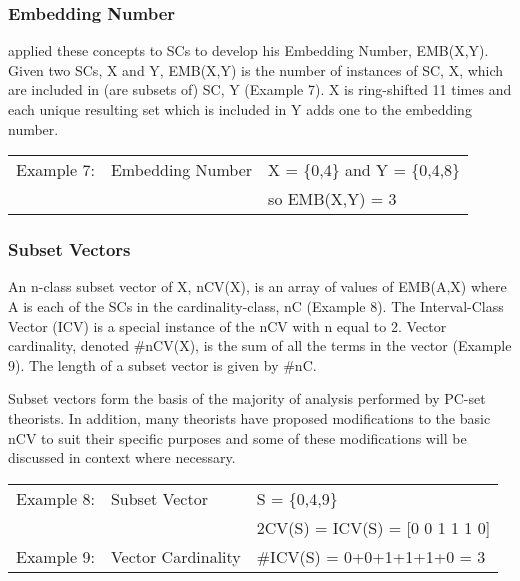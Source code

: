 \documentclass{article}
\begin{document}
\subsubsection{Embedding Number}
\label{sec-3-3-2}

\citet{Lewin1979} applied these concepts to SCs to develop his
Embedding Number, EMB(X,Y). Given two SCs, X and Y, EMB(X,Y) is the
number of instances of SC, X, which are included in (are subsets of)
SC, Y (Example 7). X is ring-shifted 11 times and each unique
resulting set which is included in Y adds one to the embedding number.

\begin{center}
\begin{tabular}{lll}
 Example 7:  &  Embedding Number  &  X = \{0,4\} and Y = \{0,4,8\}  \\
             &                    &  so EMB(X,Y) = 3                \\
\end{tabular}
\end{center}
\subsubsection{Subset Vectors}
\label{sec-3-3-3}

An n-class subset vector of X, nCV(X), is an array of values of
EMB(A,X) where A is each of the SCs in the cardinality-class, nC
(Example 8). The Interval-Class Vector (ICV) is a special instance of
the nCV with n equal to 2. Vector cardinality, denoted \#nCV(X), is the
sum of all the terms in the vector (Example 9). The length of a subset
vector is given by \#nC.

Subset vectors form the basis of the majority of analysis performed
by PC-set theorists. In addition, many theorists have proposed
modifications to the basic nCV to suit their specific purposes and
some of these modifications will be discussed in context where
necessary.


\begin{center}
\begin{tabular}{lll}
 Example 8:  &  Subset Vector       &  S = \{0,4,9\}                    \\
             &                      &  2CV(S) = ICV(S) = [0 0 1 1 1 0]  \\
 Example 9:  &  Vector Cardinality  &  \#ICV(S) = 0+0+1+1+1+0 = 3       \\
\end{tabular}
\end{center}
\end{document}
